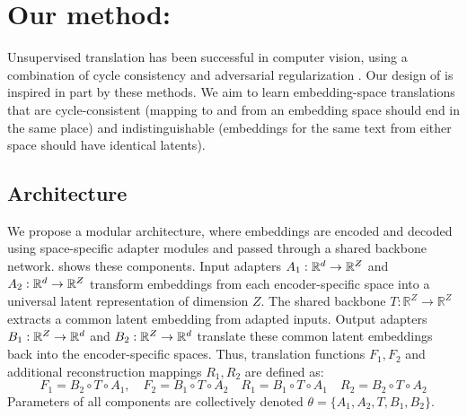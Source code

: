 \section{Our method: \atk{}}
\label{sec:architecture}

Unsupervised translation has been successful in computer vision, using a combination of cycle consistency and adversarial regularization \citep{liu2018unsupervisedimagetoimagetranslationnetworks,zhu2020unpairedimagetoimagetranslationusing}.  Our design of \atk{} is inspired in part by these methods.  We aim to learn embedding-space translations that are cycle-consistent (mapping to and from an embedding space should end in the same place) and indistinguishable (embeddings for the same text from either space should have identical latents). 



\subsection{Architecture} 
\label{subsec:method-arch}

We propose a modular architecture, where embeddings are encoded and decoded using space-specific adapter modules and passed through a shared backbone network.    shows these components. {Input adapters} $A_1 :\mathbb{R}^{d} \to \mathbb{R}^{Z}$ and $A_2: \mathbb{R}^{d} \to \mathbb{R}^{Z}$ transform embeddings from each encoder-specific space into a universal latent representation of dimension $Z$. The {shared backbone} $T : \mathbb{R}^{Z} \to \mathbb{R}^{Z}$ extracts a common latent embedding from adapted inputs. Output adapters $B_1 : \mathbb{R}^{Z} \to \mathbb{R}^{d}$ and $B_2: \mathbb{R}^{Z} \to \mathbb{R}^{d}$ translate these common latent embeddings back into the encoder-specific spaces. Thus, translation functions $F_1, F_2$ and additional reconstruction mappings $R_1, R_2$ are defined as:
\begin{equation*}
    F_1=B_2 \circ T \circ A_1,\quad F_2=B_1 \circ T \circ A_2\quad R_1=B_1 \circ T \circ A_1\quad R_2=B_2 \circ T \circ A_2
\end{equation*}
Parameters of all components are collectively denoted $\theta = \{A_1, A_2, T, B_1, B_2\}$.


